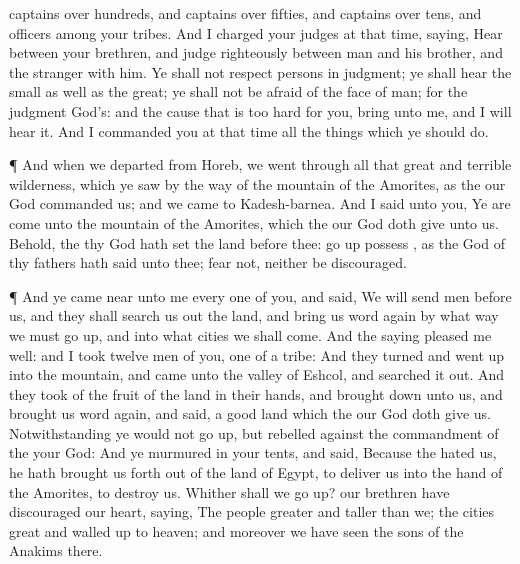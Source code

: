 {captains over
hundreds, and
captains over
fifties, and
captains over
tens, and
officers among your
tribes.
And I
charged your
judges at that
time,
saying,
Hear
{} between your
brethren, and
judge
righteously between
{}
man and his
brother, and the
stranger
{} with him.
Ye shall not
respect
persons in
judgment;
{} ye shall
hear the
small as well as the
great; ye shall not be
afraid of the
face of
man; for the
judgment
{}
God’s: and the
cause that is too
hard for you,
bring
{} unto me, and I will
hear it.
And I
commanded you at that
time all the
things which ye should
do.
\par }{\PP {}¶ And when we
departed from
Horeb, we went
through all that
great and
terrible
wilderness, which ye
saw by the
way of the
mountain of the
Amorites, as the
{} our
God
commanded us; and we
came to
Kadesh-barnea.
And I
said unto you, Ye are
come unto the
mountain of the
Amorites, which the
{} our
God doth
give unto us.
Behold, the
{} thy
God hath
set the
land
before thee: go
up
{}
possess
{}, as the
{}
God of thy
fathers hath
said unto thee;
fear not, neither be
discouraged.
\par }{\PP {}¶ And ye came
near unto me every one of you, and
said, We will
send
men
before us, and they shall search us
out the
land, and
bring us
word
again by what
way we must go
up, and into what
cities we shall
come.
And the
saying pleased me
well: and I
took
twelve
men of you,
one of a
tribe:
And they
turned and went
up into the
mountain, and
came unto the
valley of
Eshcol, and searched it
out.
And they
took of the
fruit of the
land in their
hands, and brought
{}
down unto us, and
brought us
word
again, and
said,
{} a
good
land which the
{} our
God doth
give us.
Notwithstanding ye
would not go
up, but
rebelled against the
commandment of the
{} your
God:
And ye
murmured in your
tents, and
said, Because the
{}
hated us, he hath brought us
forth out of the
land of
Egypt, to
deliver us into the
hand of the
Amorites, to
destroy us.
Whither shall we go
up? our
brethren have
discouraged our
heart,
saying, The
people
{}
greater and
taller than we; the
cities
{}
great and walled
up to
heaven; and moreover we have
seen the
sons of the
Anakims there.
}
